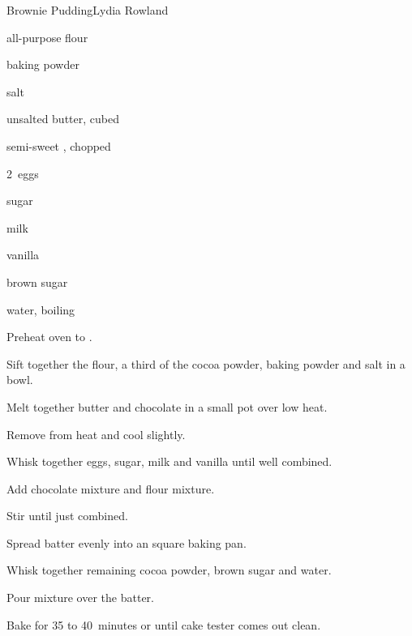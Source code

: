 \begin{recipe}{Brownie Pudding}{Lydia Rowland}{}

\begin{ingredients}
\item {} all-purpose flour
\item \C{\twothird} 
\item {} baking powder
\item \tp{\half} salt
\item {} unsalted butter, cubed
\item \C{\half} semi-sweet , chopped
\item 2~eggs
\item {} sugar
\item \C{\half} milk
\item {} vanilla
\item \C{\half} brown sugar
\item \C{1\third} water, boiling
\end{ingredients}

\begin{directions}
\item Preheat oven to .
\item Sift together the flour, a third of the cocoa powder, baking powder and salt in a bowl.
\item Melt together butter and chocolate in a small pot over low heat.
\item Remove from heat and cool slightly.
\item Whisk together eggs, sugar, milk and vanilla until well combined.
\item Add chocolate mixture and flour mixture.
\item Stir until just combined.
\item Spread batter evenly into an  square baking pan.
\item Whisk together remaining cocoa powder, brown sugar and water.
\item Pour mixture over the batter.
\item Bake for 35 to 40~minutes or until cake tester comes out clean.
\end{directions}

\end{recipe}
